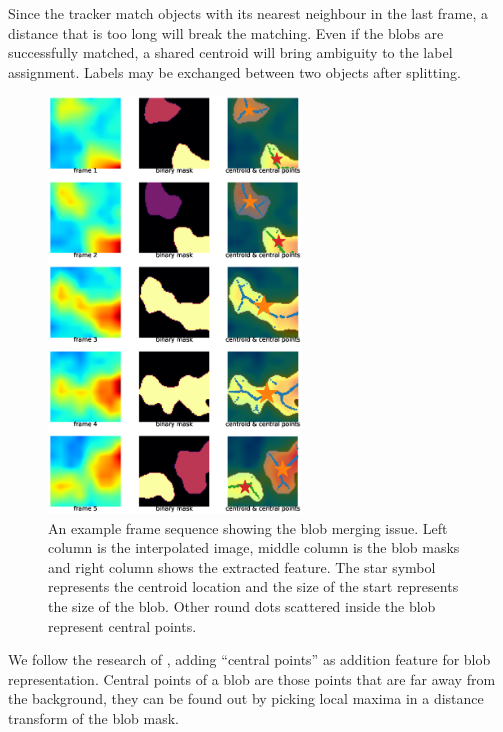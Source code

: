 Since the tracker match objects with its nearest neighbour in the last frame, a distance that is too long will break the matching. Even if the blobs are successfully matched, a shared centroid will bring ambiguity to the label assignment. Labels may be exchanged between two objects after splitting.
\begin{figure}
  \centering
  \includegraphics[width=0.6\textwidth]{figures/blobmerge.eps}
  \caption{An example frame sequence showing the blob merging issue. Left column is the interpolated image, middle column is the blob masks and right column shows the extracted feature. The star symbol represents the centroid location and the size of the start represents the size of the blob. Other round dots scattered inside the blob represent central points.}\label{fig:blobmerge}
\end{figure}

We follow the research of \cite{sharma2012blob}, adding ``central points'' as addition feature for blob representation. Central points of a blob are those points that are far away from the background, they can be found out by picking local maxima in a distance transform of the blob mask.
